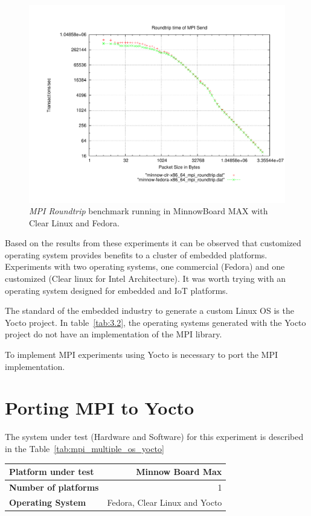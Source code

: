 \begin{figure}
  \includegraphics[width=\paperwidth]{images/mpbench_clr_experiments/mpi_roundtrip.pdf}
\caption{\textit{MPI Roundtrip} benchmark running in MinnowBoard MAX with Clear Linux and
Fedora.}
\label{mpi_roundtrip_clr_fedora}
\end{figure}

Based on the results from these experiments it can be observed that customized 
operating system provides benefits to a cluster of embedded platforms. Experiments 
with two operating systems, one commercial (Fedora) and one customized (Clear
linux for Intel Architecture). It was worth trying with an operating system
designed for embedded and IoT platforms. 

The standard of the embedded industry to generate a custom Linux OS
is the Yocto project. In table~\ref{tab:3.2}, the operating systems
generated with the Yocto project do not have an implementation of the MPI
library.

To implement MPI experiments using Yocto is necessary to port the MPI
implementation.


\section{Porting MPI to Yocto}

The system under test (Hardware and Software) for this experiment is described
in the Table~\ref{tab:mpi_multiple_os_yocto}

    \begin{center}
    \begin{tabular}{ | l | r |}
        \hline
        \textbf{Platform under test} & Minnow Board  Max \\ \hline
        \textbf{Number of platforms} & 1  \\ \hline
        \textbf{Operating System} & Fedora, Clear Linux and Yocto  \\ \hline
    \end{tabular}
    \label{tab:mpi_multiple_os_yocto}
    \end{center}

